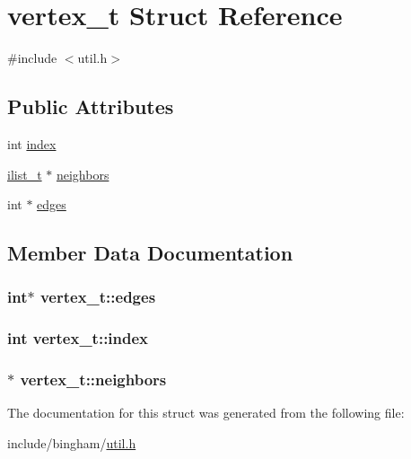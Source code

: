 \hypertarget{structvertex__t}{
\section{vertex\_\-t Struct Reference}
\label{structvertex__t}
}


{\ttfamily \#include $<$util.h$>$}

\subsection*{Public Attributes}
\begin{DoxyCompactItemize}
\item 
int \hyperlink{structvertex__t_a04757125e1e5d8132ba29dfd8c6f786b}{index}
\item 
\hyperlink{structilist}{ilist\_\-t} $\ast$ \hyperlink{structvertex__t_a182217bc9c66e3712b4bae0818895a3d}{neighbors}
\item 
int $\ast$ \hyperlink{structvertex__t_a791a560383ea1de802d3f6ee58ffd130}{edges}
\end{DoxyCompactItemize}


\subsection{Member Data Documentation}
\hypertarget{structvertex__t_a791a560383ea1de802d3f6ee58ffd130}{
\subsubsection[{edges}]{\setlength{\rightskip}{0pt plus 5cm}int$\ast$ {\bf vertex\_\-t::edges}}}
\label{structvertex__t_a791a560383ea1de802d3f6ee58ffd130}
\hypertarget{structvertex__t_a04757125e1e5d8132ba29dfd8c6f786b}{
\subsubsection[{index}]{\setlength{\rightskip}{0pt plus 5cm}int {\bf vertex\_\-t::index}}}
\label{structvertex__t_a04757125e1e5d8132ba29dfd8c6f786b}
\hypertarget{structvertex__t_a182217bc9c66e3712b4bae0818895a3d}{
\subsubsection[{neighbors}]{$\ast$ {\bf vertex\_\-t::neighbors}}}
\label{structvertex__t_a182217bc9c66e3712b4bae0818895a3d}


The documentation for this struct was generated from the following file:\begin{DoxyCompactItemize}
\item 
include/bingham/\hyperlink{util_8h}{util.h}\end{DoxyCompactItemize}
